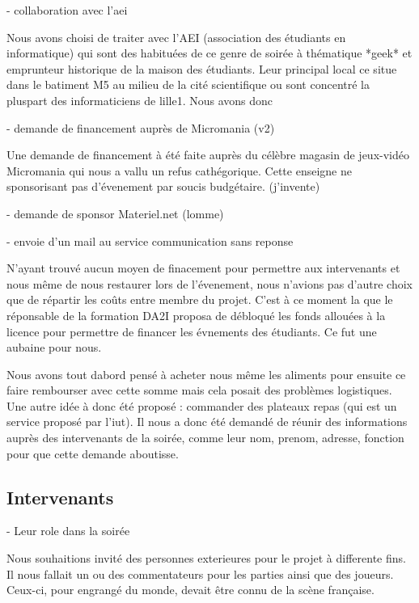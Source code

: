 - collaboration avec l'aei

  Nous avons choisi de traiter avec l'AEI (association des étudiants
  en informatique) qui sont des habituées de ce genre de soirée à
  thématique *geek* et emprunteur historique de la maison des étudiants.
  Leur principal local ce situe dans le batiment M5 au milieu de la
  cité scientifique ou sont concentré la pluspart des informaticiens de
  lille1.
  Nous avons donc

- demande de financement auprès de Micromania (v2)

  Une demande de financement à été faite auprès du célèbre magasin de
  jeux-vidéo Micromania qui nous a vallu un refus cathégorique. Cette
  enseigne ne sponsorisant pas d'évenement par soucis
  budgétaire. (j'invente)

- demande de sponsor Materiel.net (lomme)

- envoie d'un mail au service communication sans reponse

  N'ayant trouvé aucun moyen de finacement pour permettre aux
  intervenants et nous même de nous restaurer lors de l'évenement, nous
  n'avions pas d'autre choix que de répartir les coûts entre membre du
  projet. C'est à ce moment la que le réponsable de la formation DA2I
  proposa de débloqué les fonds allouées à la licence pour permettre de
  financer les évnements des étudiants. Ce fut une aubaine pour nous.

  Nous avons tout dabord pensé à acheter nous même les aliments pour
  ensuite ce faire rembourser avec cette somme mais cela posait des
  problèmes logistiques. Une autre idée à donc été proposé : commander des
  plateaux repas (qui est un service proposé par l'iut). Il nous a donc
  été demandé de réunir des informations auprès des intervenants de la
  soirée, comme leur nom, prenom, adresse, fonction pour que cette demande
  aboutisse.

\subsection{Intervenants}%
\label{sub:intervenants}

- Leur role dans la soirée

  Nous souhaitions invité des personnes exterieures pour le projet à
  differente fins. Il nous fallait un ou des commentateurs pour les
  parties ainsi que des joueurs. Ceux-ci, pour engrangé du monde, devait
  être connu de la scène française.


